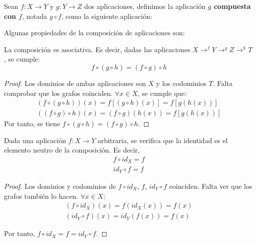 \begin{definicion}[Composición]
    Sean $f:X\rightarrow Y$ y $g:Y \rightarrow Z$ dos aplicaciones, definimos la aplicación \textbf{$g$ compuesta con $f$}, notada $g \circ f$, como la siguiente aplicación:
\end{definicion}

Algunas propiedades de la composición de aplicaciones son:
\begin{prop}\label{prop:CompAsoc}
    La composición es asociativa. Es decir, dadas las aplicaciones $\displaystyle X \mathop{\longrightarrow}^{f} Y \mathop{\longrightarrow}^{g} Z \mathop{\longrightarrow}^{h} T$, se cumple:
    $$f \circ (g \circ h) = (f \circ g) \circ h$$
\end{prop}
\begin{proof}
    Los dominios de ambas aplicaciones son $X$ y los codominios $T$. Falta comprobar que los grafos coinciden.
    $\forall x \in X$, se cumple que:
    \begin{gather*}
        (f \circ (g \circ h))(x) = f[(g\circ h)(x)] = f[g(h(x))]\\
        ((f \circ g) \circ h)(x) = (f\circ g)(h(x)) = f[g(h(x))]
    \end{gather*}
    Por tanto, se tiene $f \circ (g \circ h) = (f \circ g) \circ h$.
\end{proof}

\begin{prop}
    Dada una aplicación $f:X \rightarrow Y$ arbitraria, se verifica que la identidad es el elemento neutro de la composición. Es decir,
    \begin{gather*}
        f \circ id_X = f\\
        id_Y \circ f = f
    \end{gather*}
\end{prop}
\begin{proof}
    Los dominios y codominios de $f \circ id_X$, $f$, $id_Y \circ f$ coinciden. Falta ver que los grafos también lo hacen. $\forall x \in X$:
    \begin{gather*}
        (f \circ id_X)(x) = f(id_X(x)) = f(x) \\
        (id_Y \circ f)(x) = id_Y(f(x)) = f(x)
    \end{gather*}

    Por tanto, $f \circ id_X = f = id_Y \circ f$.
\end{proof}

